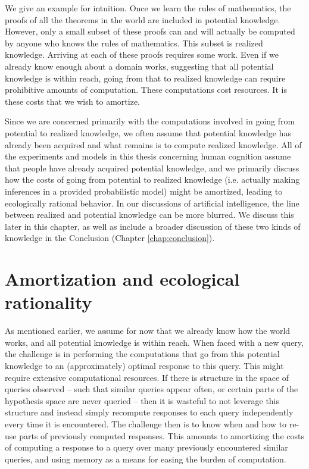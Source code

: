 We give an example for intuition. Once we learn the rules of mathematics, the proofs of all the theorems in the world are included in potential knowledge. However, only a small subset of these proofs can and will actually be computed by anyone who knows the rules of mathematics. This subset is realized knowledge. Arriving at each of these proofs requires some work. Even if we already know enough about a domain works, suggesting that all potential knowledge is within reach, going from that to realized knowledge can require prohibitive amounts of computation. These computations cost resources. It is these costs that we wish to amortize. 

Since we are concerned primarily with the computations involved in going from potential to realized knowledge, we often assume that potential knowledge has already been acquired and what remains is to compute realized knowledge. All of the experiments and models in this thesis concerning human cognition assume that people have already acquired potential knowledge, and we primarily discuss how the costs of going from potential to realized knowledge (i.e. actually making inferences in a provided probabilistic model) might be amortized, leading to ecologically rational behavior. In our discussions of artificial intelligence, the line between realized and potential knowledge can be more blurred. We discuss this later in this chapter, as well as include a broader discussion of these two kinds of knowledge in the Conclusion (Chapter \ref{chap:conclusion}).

\section{Amortization and ecological rationality}

As mentioned earlier, we assume for now that we already know how the world works, and all potential knowledge is within reach. When faced with a new query, the challenge is in performing the computations that go from this potential knowledge to an (approximately) optimal response to this query. This might require extensive computational resources. If there is structure in the space of queries observed -- such that similar queries appear often, or certain parts of the hypothesis space are never queried -- then it is wasteful to not leverage this structure and instead simply recompute responses to each query independently every time it is encountered. The challenge then is to know when and how to re-use parts of previously computed responses. This amounts to amortizing the costs of computing a response to a query over many previously encountered similar queries, and using memory as a means for easing the burden of computation.

